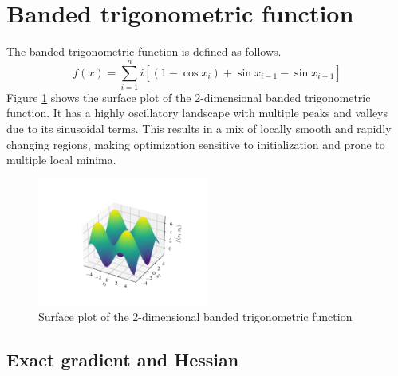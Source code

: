 \section{Banded trigonometric function}
\label{sec:banded_trigonometric_results}

The banded trigonometric function is defined as follows.
\begin{equation}
f(x) = \sum_{i=1}^n i[(1-\cos x_i) + \sin x_{i-1} - \sin x_{i+1}]
\end{equation}
Figure \ref{fig:banded_trigonometric_surf} shows the surface plot of the 2-dimensional banded trigonometric function.
It has a highly oscillatory landscape with multiple peaks and valleys due to its sinusoidal terms.
This results in a mix of locally smooth and rapidly changing regions, making optimization sensitive to initialization and prone to multiple local minima.
\begin{figure}
    \centering
    \includegraphics[width=0.5\textwidth]{figures/banded_trigonometric_surf.pdf}
    \caption{Surface plot of the 2-dimensional banded trigonometric function}
    \label{fig:banded_trigonometric_surf}
\end{figure}

\subsection{Exact gradient and Hessian}

